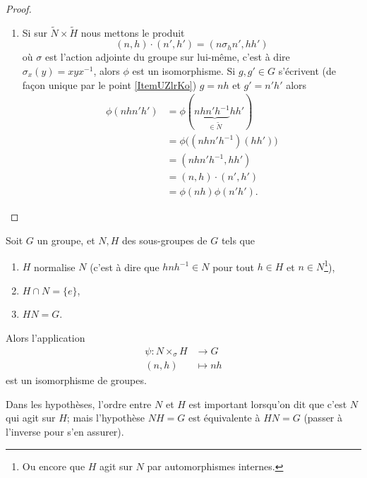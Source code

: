 \begin{proof}
\begin{enumerate}
        \item
            Si sur \( \tilde N\times \tilde H\) nous mettons le produit
            \begin{equation}
                (n,h)\cdot(n',h')=(n\sigma_hn',hh')
            \end{equation}
            où \( \sigma\) est l'action adjointe du groupe sur lui-même, c'est à dire \( \sigma_x(y)=xyx^{-1}\), alors \( \phi\) est un isomorphisme. Si \( g,g'\in G\) s'écrivent (de façon unique par le point \ref{ItemUZlrKo}) \( g=nh\) et \( g'=n'h'\) alors
            \begin{subequations}
                \begin{align}
                    \phi(nhn'h')&=\phi(n\underbrace{hn'h^{-1}}_{\in \tilde N}hh')\\
                    &=\phi\big( (nhn'h^{-1})(hh') \big)\\
                    &=(nhn'h^{-1},hh')\\
                    &=(n,h)\cdot(n',h')\\
                    &=\phi(nh)\phi(n'h').
                \end{align}
            \end{subequations}
    \end{enumerate}
\end{proof}

\begin{corollary}\label{CoroGohOZ}
    Soit \( G\) un groupe, et \( N,H\) des sous-groupes de \( G\) tels que
    \begin{enumerate}
        \item
            \( H\) normalise \( N\) (c'est à dire que \( hnh^{-1}\in N\) pour tout \( h\in H\) et \( n\in N\)\footnote{Ou encore que \( H\) agit sur \( N\) par automorphismes internes.}),
        \item
            \( H\cap N=\{ e \}\),
        \item
            \( HN=G\).
    \end{enumerate}
    Alors l'application
    \begin{equation}
        \begin{aligned}
            \psi\colon N\times_{\sigma}H&\to G \\
            (n,h)&\mapsto nh 
        \end{aligned}
    \end{equation}
    est un isomorphisme de groupes.
\end{corollary}
Dans les hypothèses, l'ordre entre \( N\) et \( H\) est important lorsqu'on dit que c'est \( N\) qui agit sur \( H\); mais l'hypothèse \( NH=G\) est équivalente à \( HN=G\) (passer à l'inverse pour s'en assurer).

